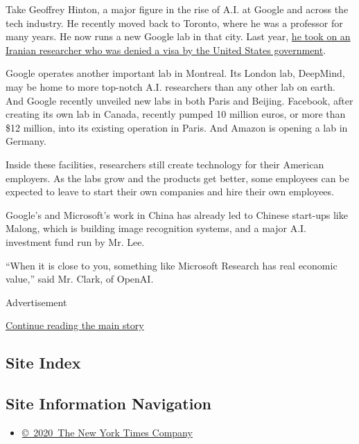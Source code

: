 Take Geoffrey Hinton, a major figure in the rise of A.I. at Google and
across the tech industry. He recently moved back to Toronto, where he
was a professor for many years. He now runs a new Google lab in that
city. Last year,
\href{https://www.nytimes.com/2017/11/28/technology/artificial-intelligence-research-toronto.html}{he
took on an Iranian researcher who was denied a visa by the United States
government}.

Google operates another important lab in Montreal. Its London lab,
DeepMind, may be home to more top-notch A.I. researchers than any other
lab on earth. And Google recently unveiled new labs in both Paris and
Beijing. Facebook, after creating its own lab in Canada, recently pumped
10 million euros, or more than \$12 million, into its existing operation
in Paris. And Amazon is opening a lab in Germany.

Inside these facilities, researchers still create technology for their
American employers. As the labs grow and the products get better, some
employees can be expected to leave to start their own companies and hire
their own employees.

Google's and Microsoft's work in China has already led to Chinese
start-ups like Malong, which is building image recognition systems, and
a major A.I. investment fund run by Mr. Lee.

``When it is close to you, something like Microsoft Research has real
economic value,'' said Mr. Clark, of OpenAI.

Advertisement

\protect\hyperlink{after-bottom}{Continue reading the main story}

\hypertarget{site-index}{%
\subsection{Site Index}\label{site-index}}

\hypertarget{site-information-navigation}{%
\subsection{Site Information
Navigation}\label{site-information-navigation}}

\begin{itemize}
\tightlist
\item
  \href{https://help.nytimes.com/hc/en-us/articles/115014792127-Copyright-notice}{©~2020~The
  New York Times Company}
\end{itemize}

